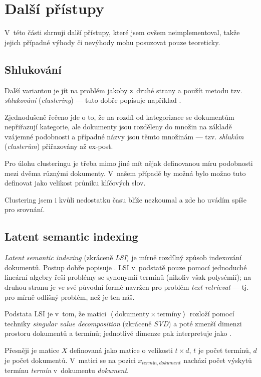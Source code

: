 \documentclass[12pt,a4paper]{report}
\begin{document}
\section{Další přístupy}
V~této části shrnuji další přístupy, které jsem ovšem neimplementoval, takže jejich případné výhody či nevýhody mohu posuzovat pouze teoreticky.

\subsection{Shlukování}
Další variantou je jít na problém jakoby z~druhé strany a použít metodu tzv. \emph{shlukování} (\emph{clustering}) --- tuto dobře popisuje například \cite{clustering}.

Zjednodušeně řečeno jde o to, že na rozdíl od kategorizace se dokumentům nepřiřazují kategorie, ale dokumenty jsou rozděleny do množin na základě vzájemné podobnosti a případné názvy jsou těmto množinám --- tzv. \emph{shlukům} (\emph{clusterům}) přiřazovány až ex-post. 

Pro úlohu clusteringu je třeba mimo jiné mít nějak definovanou míru podobnosti mezi dvěma různými dokumenty. V~našem případě by možná bylo možno tuto  de\-fi\-no\-vat ja\-ko ve\-li\-kost prů\-ni\-ku klíčových slov.

Clustering jsem i kvůli nedostatku času blíže nezkoumal a zde ho uvádím spíše pro srovnání.

\subsection{Latent semantic indexing}
\emph{Latent semantic indexing} (zkráceně \emph{LSI}) je mírně rozdílný způsob indexování dokumentů. Postup dobře popisuje \cite{lsi}. LSI v~podstatě pouze pomocí jednoduché lineární algebry řeší problémy se synonymií termínů (nikoliv však polysémií); na druhou stranu je ve své původní formě navržen pro problém \emph{text retrieval} --- tj. pro mírně odlišný problém, než je ten náš.

Podstata LSI je v~tom, že matici $\left< \mathrm{dokumenty} \times \mathrm{termíny}\right>$ rozloží pomocí techniky \emph{singular value decomposition} (zkráceně \emph{SVD}) a poté zmenší dimenzi prostoru dokumentů a termínů; jednotlivé dimenze pak \cite{lsi} interpretuje jako .

Přesněji je matice $X$ definovaná jako matice o velikosti $t\times d$, $t$ je počet termínů, $d$ je počet dokumentů. V~matici se na pozici $x_{termín, dokument}$ nachází počet výskytů termínu \emph{termín} v~dokumentu \emph{dokument}. 
\end{document}
